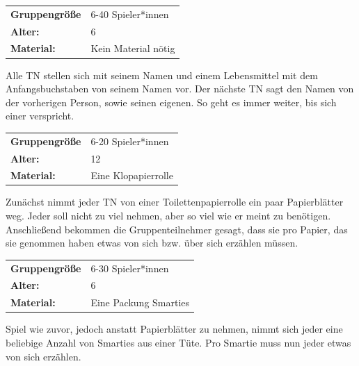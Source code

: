 \begin{table}[H]
\begin{tabular}{>{\bfseries}lp{8cm}}
   Gruppengröße   & 6-40 Spieler*innen\\
    Alter: & 6 \\
    Material: & Kein Material nötig \\
\end{tabular}
\end{table} 
    Alle TN stellen sich mit seinem Namen und einem Lebensmittel mit dem Anfangsbuchstaben von seinem Namen vor. Der nächste TN sagt den Namen von der vorherigen Person, sowie seinen eigenen. So geht es immer weiter, bis sich einer verspricht. \\



\begin{table}[H]
\begin{tabular}{>{\bfseries}lp{8cm}}
  Gruppengröße   & 6-20 Spieler*innen\\
    Alter: & 12 \\
    Material: & Eine Klopapierrolle \\ 
\end{tabular}
\end{table} 

 Zunächst nimmt jeder TN von einer Toilettenpapierrolle ein paar Papierblätter weg. Jeder soll nicht zu viel nehmen, aber so viel wie er meint zu benötigen. Anschließend bekommen die Gruppenteilnehmer gesagt, dass sie pro Papier, das sie genommen haben etwas von sich bzw. über sich erzählen müssen. \\



\begin{table}[H]
\begin{tabular}{>{\bfseries}lp{8cm}}
   Gruppengröße   & 6-30 Spieler*innen\\
    Alter: & 6 \\
    Material: & Eine Packung Smarties \\
\end{tabular}
\end{table} 
Spiel wie zuvor, jedoch anstatt Papierblätter zu nehmen, nimmt sich jeder eine beliebige Anzahl von Smarties aus einer Tüte. Pro Smartie muss nun jeder etwas von sich erzählen. \\



